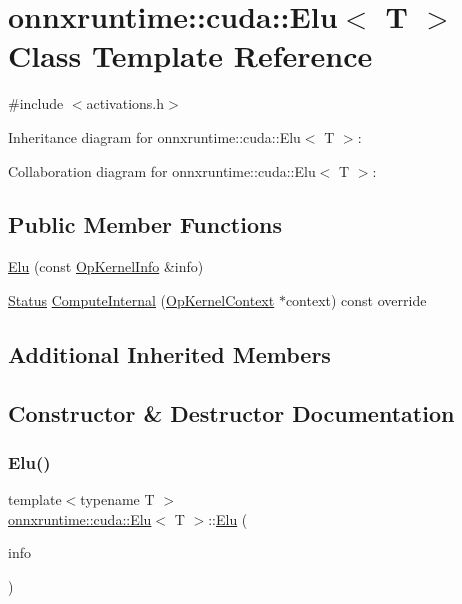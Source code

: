 \hypertarget{classonnxruntime_1_1cuda_1_1Elu}{}\section{onnxruntime\+:\+:cuda\+:\+:Elu$<$ T $>$ Class Template Reference}
\label{classonnxruntime_1_1cuda_1_1Elu}


{\ttfamily \#include $<$activations.\+h$>$}



Inheritance diagram for onnxruntime\+:\+:cuda\+:\+:Elu$<$ T $>$\+:


Collaboration diagram for onnxruntime\+:\+:cuda\+:\+:Elu$<$ T $>$\+:
\subsection*{Public Member Functions}
\begin{DoxyCompactItemize}
\item 
\mbox{\hyperlink{classonnxruntime_1_1cuda_1_1Elu_a426e44072dd24a94c9adef9e09a3e2ee}{Elu}} (const \mbox{\hyperlink{classonnxruntime_1_1OpKernelInfo}{Op\+Kernel\+Info}} \&info)
\item 
\mbox{\hyperlink{classonnxruntime_1_1common_1_1Status}{Status}} \mbox{\hyperlink{classonnxruntime_1_1cuda_1_1Elu_aa40f277b34ac1ff53dffe20aabc695b3}{Compute\+Internal}} (\mbox{\hyperlink{classonnxruntime_1_1OpKernelContext}{Op\+Kernel\+Context}} $\ast$context) const override
\end{DoxyCompactItemize}
\subsection*{Additional Inherited Members}


\subsection{Constructor \& Destructor Documentation}
\mbox{\label{classonnxruntime_1_1cuda_1_1Elu_a426e44072dd24a94c9adef9e09a3e2ee}} 
\subsubsection{\texorpdfstring{Elu()}{Elu()}}
{\footnotesize\ttfamily template$<$typename T $>$ \\
\mbox{\hyperlink{classonnxruntime_1_1cuda_1_1Elu}{onnxruntime\+::cuda\+::\+Elu}}$<$ T $>$\+::\mbox{\hyperlink{classonnxruntime_1_1cuda_1_1Elu}{Elu}} (\begin{DoxyParamCaption}\item[{const \mbox{\hyperlink{classonnxruntime_1_1OpKernelInfo}{Op\+Kernel\+Info}} \&}]{info }\end{DoxyParamCaption})\hspace{0.3cm}{\ttfamily [inline]}}




